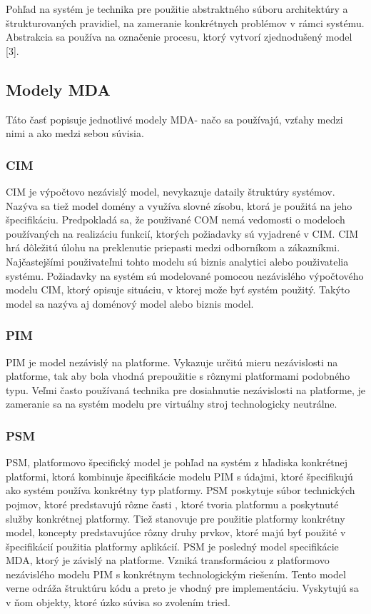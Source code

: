 \documentclass[a4paper]{feidippp}
\begin{document}
Pohľad na systém  je technika pre použitie abstraktného súboru architektúry a štrukturovaných pravidiel, na zameranie konkrétnych problémov v rámci systému. Abstrakcia sa používa na označenie procesu, ktorý vytvorí zjednodušený model  [3].


\subsection{Modely MDA}

Táto časť popisuje jednotlivé modely MDA- načo sa používajú, vzťahy medzi nimi a ako medzi sebou súvisia. 

\subsubsection{	CIM}
CIM je výpočtovo nezávislý model, nevykazuje dataily štruktúry systémov. Nazýva sa tiež model domény a využíva slovné zísobu, ktorá je použitá na jeho špecifikáciu.
	Predpokladá sa, že použivané COM nemá vedomosti o modeloch používaných na realizáciu funkcií, ktorých požiadavky sú vyjadrené v CIM. CIM hrá dôležitú úlohu na preklenutie priepasti medzi odborníkom a zákazníkmi. Najčastejšími použivateľmi tohto modelu sú biznis analytici alebo použivatelia systému. 
Požiadavky na systém sú modelované pomocou nezávislého výpočtového modelu CIM, ktorý opisuje situáciu, v ktorej može byť systém použitý. Takýto model sa nazýva aj doménový model alebo biznis model. 

\subsubsection{	PIM}

PIM je model nezávislý na platforme. Vykazuje určitú mieru nezávislosti na platforme, tak aby bola vhodná prepoužitie s rôznymi platformami podobného typu. Veľmi často používaná technika pre dosiahnutie nezávislosti na platforme, je zameranie  sa na systém modelu pre virtuálny stroj technologicky neutrálne.
       
\subsubsection{	PSM}  
PSM, platformovo špecifický model je pohľad na systém z hľadiska konkrétnej platformi, ktorá kombinuje špecifikácie modelu PIM s údajmi, ktoré špecifikujú ako systém používa konkrétny typ platformy. PSM poskytuje súbor technických pojmov, ktoré predstavujú rôzne časti , ktoré tvoria platformu a poskytnuté služby konkrétnej platformy. Tiež stanovuje pre použitie platformy konkrétny model, koncepty predstavujúce rôzny druhy prvkov, ktoré majú byť použité v špecifikácií použitia platformy aplikácií.
	PSM je posledný model specifikácie MDA, ktorý je závislý na platforme. Vzniká transformáciou z platformovo nezávislého modelu PIM s konkrétnym technologickým riešením. Tento model verne odráža štruktúru kódu a preto je vhodný pre implementáciu. Vyskytujú sa v ňom objekty, ktoré úzko súvisa so zvolením tried.
\end{document}
